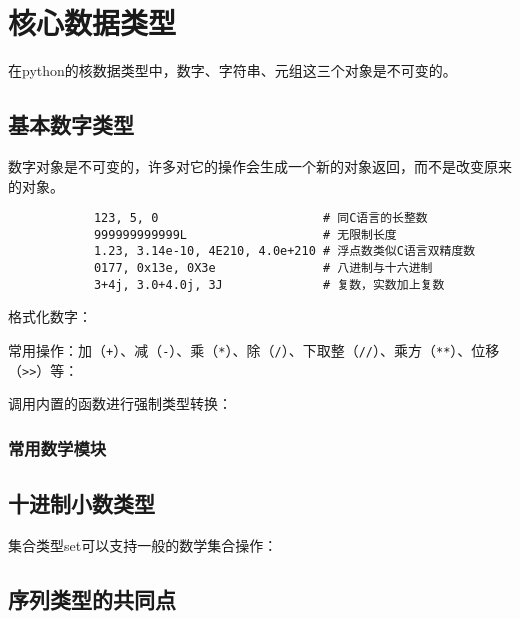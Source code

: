 

\chapter{核心数据类型}

	在python的核数据类型中，数字、字符串、元组这三个对象是不可变的。

	\section{基本数字类型}
		
		数字对象是不可变的，许多对它的操作会生成一个新的对象返回，而不是改变原来的对象。

		\begin{verbatim}
			123, 5, 0                       # 同C语言的长整数
			999999999999L                   # 无限制长度
			1.23, 3.14e-10, 4E210, 4.0e+210 # 浮点数类似C语言双精度数
			0177, 0x13e, 0X3e               # 八进制与十六进制
			3+4j, 3.0+4.0j, 3J              # 复数，实数加上复数
		\end{verbatim}

		格式化数字：

		

		常用操作：加（\verb|+|）、减（\verb|-|）、乘（\verb|*|）、除（\verb|/|）、下取整（\verb|//|）、乘方（\verb|**|）、位移（\verb|>>|）等：

		

		调用内置的函数进行强制类型转换：

		

		\subsection{常用数学模块}

		

	\section{十进制小数类型}

		集合类型set可以支持一般的数学集合操作：

		

	\section{序列类型的共同点}
		
